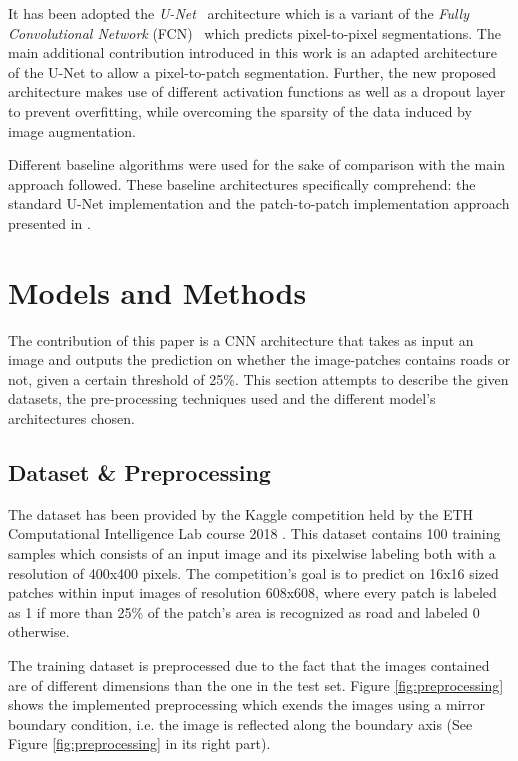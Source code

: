 \documentclass[10pt,conference,compsocconf]{IEEEtran}
\begin{document}
It has been adopted the \textit{U-Net}~\cite{Ronneberger2015} architecture which is a variant of the \textit{Fully Convolutional Network} (FCN)~\cite{Long2014} which predicts pixel-to-pixel segmentations. The main additional contribution introduced in this work is an adapted architecture of the U-Net to allow a pixel-to-patch segmentation. Further, the new proposed architecture makes use of different activation functions as well as a dropout layer to prevent overfitting, while overcoming the sparsity of the data induced by image augmentation.

Different baseline algorithms were used for the sake of comparison with the main approach followed. These baseline architectures specifically comprehend: the standard U-Net implementation and the patch-to-patch implementation approach presented in \cite{Pavllo2017}.

\section{Models and Methods}

The contribution of this paper is a CNN architecture that takes as input an image and outputs the prediction on whether the image-patches contains roads or not, given a certain threshold of 25\%. This section attempts to describe the given datasets, the pre-processing techniques used and the different model’s architectures chosen.

\subsection{Dataset \& Preprocessing}

The dataset has been provided by the Kaggle competition held by the ETH Computational Intelligence Lab course 2018 \cite{KaggleCompetition}. This dataset contains 100 training samples which consists of an input image and its pixelwise labeling both with a resolution of 400x400 pixels. The competition’s goal is to predict on 16x16 sized patches within input images of resolution 608x608, where every patch is labeled as 1 if more than 25\% of the patch’s area is recognized as road and labeled 0 otherwise.

The training dataset is preprocessed due to the fact that the images contained are of different dimensions than the one in the test set. Figure \ref{fig:preprocessing} shows the implemented preprocessing which exends the images using a mirror boundary condition, i.e. the image is reflected along the boundary axis (See Figure \ref{fig:preprocessing} in its right part).
\end{document}
